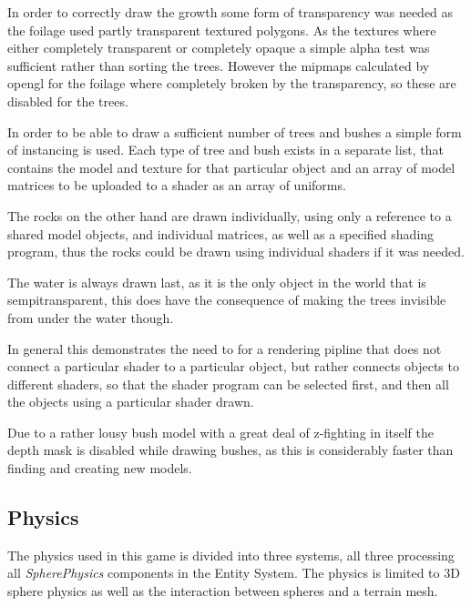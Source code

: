 In order to correctly draw the growth some form of transparency was needed as the foilage used partly transparent textured polygons. As the textures where either completely transparent or completely opaque a simple alpha test was sufficient rather than sorting the trees. However the mipmaps calculated by opengl for the foilage where completely broken by the transparency, so these are disabled for the trees.

In order to be able to draw a sufficient number of trees and bushes a simple form of instancing is used. Each type of tree and bush exists in a separate list, that contains the model and texture for that particular object and an array of model matrices to be uploaded to a shader as an array of uniforms.

The rocks on the other hand are drawn individually, using only a reference to a shared model objects, and individual matrices, as well as a specified shading program, thus the rocks could be drawn using individual shaders if it was needed.

The water is always drawn last, as it is the only object in the world that is sempitransparent, this does have the consequence of making the trees invisible from under the water though.

In general this demonstrates the need to for a rendering pipline that does not connect a particular shader to a particular object, but rather connects objects to different shaders, so that the shader program can be selected first, and then all the objects using a particular shader drawn.

Due to a rather lousy bush model with a great deal of z-fighting in itself the depth mask is disabled while drawing bushes, as this is considerably faster than finding and creating new models.

\subsection{Physics}
The physics used in this game is divided into three systems, all three processing all \textit{SpherePhysics} components in the Entity System. The physics is limited to 3D sphere physics as well as the interaction between spheres and a terrain mesh.\\
\\
